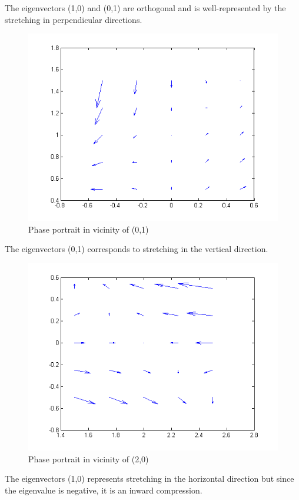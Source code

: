 \documentclass[a4paper]{article}
\begin{document}
\begin{enumerate}
\begin{enumerate}
\begin{figure}[H]
	    \end{figure}
	    The eigenvectors (1,0) and (0,1) are orthogonal and is well-represented by the stretching in perpendicular directions. 
\begin{figure}[H]
	\centering
	\includegraphics[width=12cm]{zeroone}
	\caption{Phase portrait in vicinity of (0,1) }
\end{figure}
	    The eigenvectors (0,1) corresponds to stretching in the vertical direction.
\begin{figure}[H]
	\centering
	\includegraphics[width=12cm]{two}
	\caption{Phase portrait in vicinity of (2,0) }
\end{figure}
	    The eigenvectors (1,0) represents stretching in the horizontal direction but since the eigenvalue is negative, it is an inward compression.
\begin{figure}[H]
	\centering

\end{figure}
\end{enumerate}
\end{enumerate}
\end{document}
